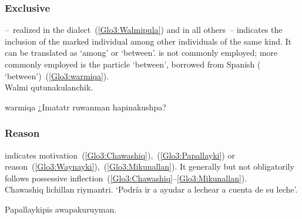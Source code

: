 \subsubsection{Exclusive }
 --~realized  in the \CH{} dialect~(\ref{Glo3:Walmipula}) and  in all others~-- indicates the inclusion of the marked individual among other individuals of the same kind. It can be translated as ‘among’ or ‘between’.  is not commonly employed; more commonly employed is the particle  ‘between’, borrowed from Spanish ( ‘between’)~(\ref{Glo3:warmiqa}).\\

%
{Walmi qutunakulanchik.}%
{}%
{}{}%

%
{ warmiqa ¿Imatatr ruwanman hapinakushpa?}%
{}%
{}{}%

\subsubsection{Reason }
 indicates motivation~(\ref{Glo3:Chawashiq}),~(\ref{Glo3:Papallayki}) or reason~(\ref{Glo3:Waynayki}),~(\ref{Glo3:Mikunallan}). It generally but not obligatorily follows possessive inflection~(\ref{Glo3:Chawashiq}--\ref{Glo3:Mikunallan}).\\

%
{Chawashiq lichillan riymantri.}%
{}%
{‘Podría ir a ayudar a lechear a cuenta de su leche’.}%
{}{}%

%
{Papallaykipis awapakuruyman.}%
{}%
{}{}%

